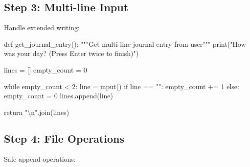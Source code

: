 \documentclass[
  letterpaper,
  DIV=11,
  numbers=noendperiod,
  oneside]{scrreprt}
\newenvironment{Shaded}{}{}
\newcommand{\BuiltInTok}[1]{\textcolor[rgb]{0.84,0.23,0.29}{#1}}
\newcommand{\CharTok}[1]{\textcolor[rgb]{0.01,0.18,0.38}{#1}}
\newcommand{\CommentTok}[1]{\textcolor[rgb]{0.42,0.45,0.49}{#1}}
\newcommand{\ControlFlowTok}[1]{\textcolor[rgb]{0.84,0.23,0.29}{#1}}
\newcommand{\DecValTok}[1]{\textcolor[rgb]{0.00,0.36,0.77}{#1}}
\newcommand{\KeywordTok}[1]{\textcolor[rgb]{0.84,0.23,0.29}{#1}}
\newcommand{\NormalTok}[1]{\textcolor[rgb]{0.14,0.16,0.18}{#1}}
\newcommand{\OperatorTok}[1]{\textcolor[rgb]{0.14,0.16,0.18}{#1}}
\newcommand{\StringTok}[1]{\textcolor[rgb]{0.01,0.18,0.38}{#1}}
\begin{document}
\subsection{Step 3: Multi-line Input}\label{step-3-multi-line-input}

Handle extended writing:

\begin{Shaded}
\begin{Highlighting}[]
\KeywordTok{def}\NormalTok{ get\_journal\_entry():}
    \CommentTok{"""Get multi{-}line journal entry from user"""}
    \BuiltInTok{print}\NormalTok{(}\StringTok{"How was your day? (Press Enter twice to finish)"}\NormalTok{)}
    
\NormalTok{    lines }\OperatorTok{=}\NormalTok{ []}
\NormalTok{    empty\_count }\OperatorTok{=} \DecValTok{0}
    
    \ControlFlowTok{while}\NormalTok{ empty\_count }\OperatorTok{\textless{}} \DecValTok{2}\NormalTok{:}
\NormalTok{        line }\OperatorTok{=} \BuiltInTok{input}\NormalTok{()}
        \ControlFlowTok{if}\NormalTok{ line }\OperatorTok{==} \StringTok{""}\NormalTok{:}
\NormalTok{            empty\_count }\OperatorTok{+=} \DecValTok{1}
        \ControlFlowTok{else}\NormalTok{:}
\NormalTok{            empty\_count }\OperatorTok{=} \DecValTok{0}
\NormalTok{            lines.append(line)}
    
    \ControlFlowTok{return} \StringTok{"}\CharTok{\textbackslash{}n}\StringTok{"}\NormalTok{.join(lines)}
\end{Highlighting}
\end{Shaded}

\subsection{Step 4: File Operations}\label{step-4-file-operations-1}

Safe append operations:
\end{document}
